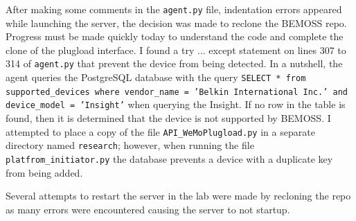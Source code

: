 \documentclass[fontsize=11pt, %
                             paper=letter, %
                             twoside, %
                             captions=tableheading,
                             index=totoc,
                             hyperref]{labbook}
\begin{document}
\begin{addmargin}[0cm]{0cm}
After making some comments in the \texttt{agent.py} file, indentation errors appeared while launching the server, the decision was made to reclone the BEMOSS repo. Progress must be made quickly today to understand the code and complete the clone of the plugload interface. I found a try ... except statement on lines 307 to 314 of \texttt{agent.py} that prevent the device from being detected. In a nutshell, the agent queries the PostgreSQL database with the query \texttt{SELECT * from supported\_devices where vendor\_name = 'Belkin International Inc.' and device\_model = 'Insight'} when querying the Insight. If no row in the table is found, then it is determined that the device is not supported by BEMOSS.
\bigbreak\noindent
I attempted to place a copy of the file \texttt{API\_WeMoPlugload.py} in a separate directory named \texttt{research}; however, when running the file \texttt{platfrom\_initiator.py} the database prevents a device with a duplicate key from being added.  

Several attempts to restart the server in the lab were made by recloning the repo as many errors were encountered causing the server to not startup.


\end{addmargin}
\end{document}
